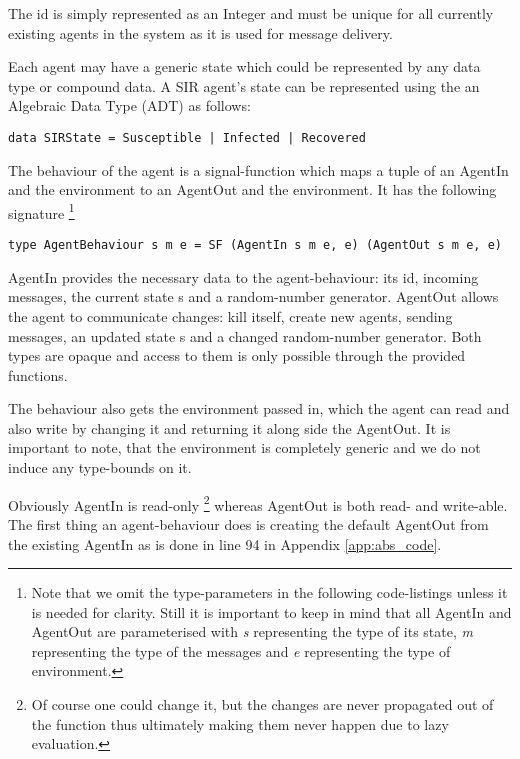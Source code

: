 The id is simply represented as an Integer and must be unique for all currently existing agents in the system as it is used for message delivery. %

Each agent may have a generic state which could be represented by any data type or compound data. A SIR agent's state can be represented using the an Algebraic Data Type (ADT) as follows:
\begin{verbatim}
data SIRState = Susceptible | Infected | Recovered
\end{verbatim}

The behaviour of the agent is a signal-function which maps a tuple of an AgentIn and the environment to an AgentOut and the environment. It has the following signature \footnote{Note that we omit the type-parameters in the following code-listings unless it is needed for clarity. Still it is important to keep in mind that all AgentIn and AgentOut are parameterised with \textit{s} representing the type of its state, \textit{m} representing the type of the messages and \textit{e} representing the type of environment.} 
\begin{verbatim}
type AgentBehaviour s m e = SF (AgentIn s m e, e) (AgentOut s m e, e)
\end{verbatim}

AgentIn provides the necessary data to the agent-behaviour: its id, incoming messages, the current state s and a random-number generator. AgentOut allows the agent to communicate changes: kill itself, create new agents, sending messages, an updated state s and a changed random-number generator. Both types are opaque and access to them is only possible through the provided functions.

The behaviour also gets the environment passed in, which the agent can read and also write by changing it and returning it along side the AgentOut. It is important to note, that the environment is completely generic and we do not induce any type-bounds on it.

Obviously AgentIn is read-only \footnote{Of course one could change it, but the changes are never propagated out of the function thus ultimately making them never happen due to lazy evaluation.} whereas AgentOut is both read- and write-able. The first thing an agent-behaviour does is creating the default AgentOut from the existing AgentIn as is done in line 94 in Appendix \ref{app:abs_code}.

